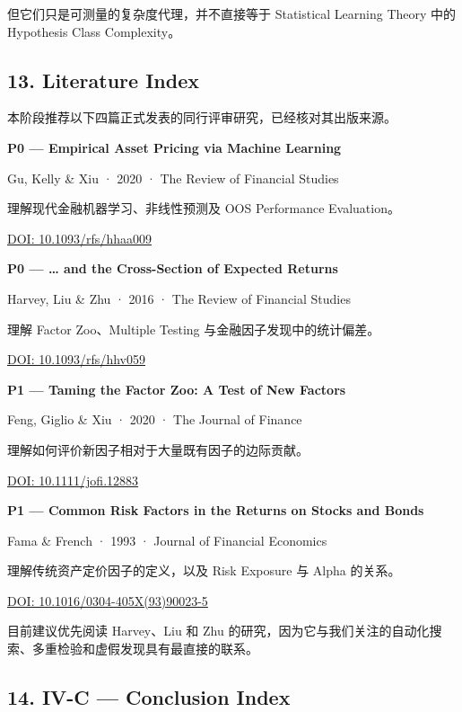 但它们只是可测量的复杂度代理，并不直接等于 Statistical Learning Theory 中的 Hypothesis Class Complexity。

\hypertarget{part-4-63-0001-literature-index}{%
\subsection{13. Literature Index}\label{part-4-63-0001-literature-index}}

本阶段推荐以下四篇正式发表的同行评审研究，已经核对其出版来源。

\textbf{P0 --- Empirical Asset Pricing via Machine Learning}

Gu, Kelly \& Xiu · 2020 · The Review of Financial Studies

理解现代金融机器学习、非线性预测及 OOS Performance Evaluation。

\href{https://doi.org/10.1093/rfs/hhaa009}{DOI: 10.1093/rfs/hhaa009}

\textbf{P0 --- \ldots{} and the Cross-Section of Expected Returns}

Harvey, Liu \& Zhu · 2016 · The Review of Financial Studies

理解 Factor Zoo、Multiple Testing 与金融因子发现中的统计偏差。

\href{https://academic.oup.com/rfs/article-abstract/29/1/5/1843824?login=false}{DOI: 10.1093/rfs/hhv059}

\textbf{P1 --- Taming the Factor Zoo: A Test of New Factors}

Feng, Giglio \& Xiu · 2020 · The Journal of Finance

理解如何评价新因子相对于大量既有因子的边际贡献。

\href{https://onlinelibrary.wiley.com/doi/full/10.1111/jofi.12883}{DOI: 10.1111/jofi.12883}

\textbf{P1 --- Common Risk Factors in the Returns on Stocks and Bonds}

Fama \& French · 1993 · Journal of Financial Economics

理解传统资产定价因子的定义，以及 Risk Exposure 与 Alpha 的关系。

\href{https://doi.org/10.1016/0304-405X\%2893\%2990023-5}{DOI: 10.1016/0304-405X(93)90023-5}

目前建议优先阅读 Harvey、Liu 和 Zhu 的研究，因为它与我们关注的自动化搜索、多重检验和虚假发现具有最直接的联系。

\hypertarget{part-4-63-0001-iv-c-conclusion-index}{%
\subsection{14. IV-C --- Conclusion Index}\label{part-4-63-0001-iv-c-conclusion-index}}


